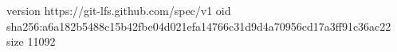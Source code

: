 version https://git-lfs.github.com/spec/v1
oid sha256:a6a182b5488c15b42fbe04d021efa14766c31d9d4a70956cd17a3ff91c36ac22
size 11092
